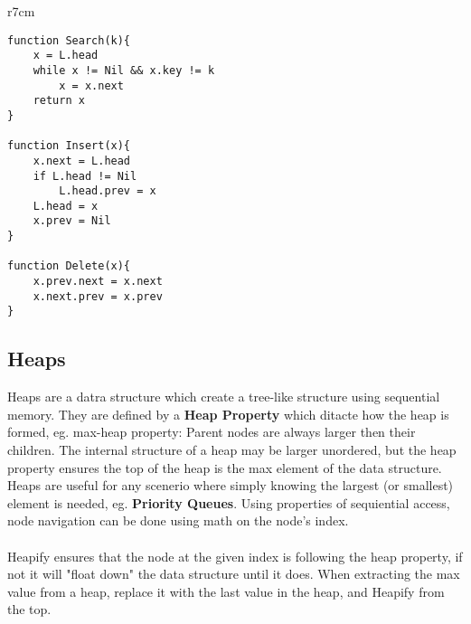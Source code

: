 \documentclass{article}
\begin{document}
\begin{wrapfigure}{r}{7cm}
\end{wrapfigure}
\begin{lstlisting}[style=pseudo]
function Search(k){
	x = L.head
	while x != Nil && x.key != k
		x = x.next
	return x
}

function Insert(x){
	x.next = L.head
	if L.head != Nil
		L.head.prev = x
	L.head = x
	x.prev = Nil
}

function Delete(x){
	x.prev.next = x.next
	x.next.prev = x.prev
}
\end{lstlisting}




\subsection{Heaps}
Heaps are a datra structure which create a tree-like structure using sequential memory. They are defined by a {\bf Heap Property} which ditacte how the heap is formed, eg. max-heap property: Parent nodes are always larger then their children. The internal structure of a heap may be larger unordered, but the heap property ensures the top of the heap is the max element of the data structure. Heaps are useful for any scenerio where simply knowing the largest (or smallest) element is needed, eg. {\bf Priority Queues}. Using properties of sequiential access, node navigation can be done using math on the node's index.
\\ \\
Heapify ensures that the node at the given index is following the heap property, if not it will "float down" the data structure until it does. When extracting the max value from a heap, replace it with the last value in the heap, and Heapify from the top.
\end{document}
